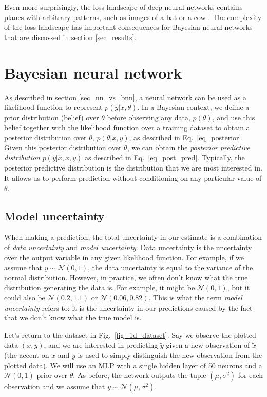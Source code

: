 \documentclass[12pt]{article}
\begin{document}
Even more surprisingly, the loss landscape of deep neural networks contains planes with arbitrary patterns, such as images of a bat or a cow \cite{sightseeing}. The complexity of the loss landscape has important consequences for Bayesian neural networks that are discussed in section \ref{sec_results}.

\section{Bayesian neural network}
\label{sec_bnn}

As described in section \ref{sec_nn_vs_bnn}, a neural network can be used as a likelihood function to represent $p(\tilde{y} | \tilde{x}, \theta)$. In a Bayesian context, we define a prior distribution (belief) over $\theta$ before observing any data, $p(\theta)$, and use this belief together with the likelihood function over a training dataset to obtain a posterior distribution over $\theta$, $p(\theta | x, y)$, as described in Eq.\ \ref{eq_posterior}. Given this posterior distribution over $\theta$, we can obtain the \textit{posterior predictive distribution} $p(\tilde{y} | \tilde{x}, x, y)$ as described in Eq.\ \ref{eq_post_pred}. Typically, the posterior predictive distribution is the distribution that we are most interested in. It allows us to perform prediction without conditioning on any particular value of $\theta$.

\subsection{Model uncertainty}
\label{sec_model_uncertain}

When making a prediction, the total uncertainty in our estimate is a combination of \textit{data uncertainty} and \textit{model uncertainty}. Data uncertainty is the uncertainty over the output variable in any given likelihood function. For example, if we assume that $y \sim \mathcal{N}(0, 1)$, the data uncertainty is equal to the variance of the normal distribution. However, in practice, we often don't know what the true distribution generating the data is. For example, it might be $\mathcal{N}(0, 1)$, but it could also be $\mathcal{N}(0.2, 1.1)$ or $\mathcal{N}(0.06, 0.82)$. This is what the term \textit{model uncertainty} refers to: it is the uncertainty in our predictions caused by the fact that we don't know what the true model is.

Let's return to the dataset in Fig.\ \ref{fig_1d_dataset}. Say we observe the plotted data $(x, y)$, and we are interested in predicting $\tilde{y}$ given a new observation of $\tilde{x}$ (the accent on $x$ and $y$ is used to simply distinguish the new observation from the plotted data). We will use an MLP with a single hidden layer of 50 neurons and a $\mathcal{N}(0, 1)$ prior over $\theta$. As before, the network outputs the tuple $(\mu, \sigma^2)$ for each observation and we assume that $y \sim \mathcal{N}(\mu, \sigma^2)$.
\end{document}

